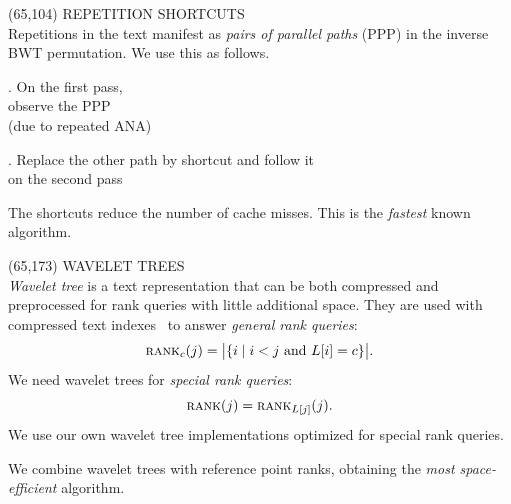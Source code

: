 \documentclass[a4paper]{article} %
\newcommand{\rank}{\textsc{rank}}
\begin{document}
\begin{textblock}{60}(65,104) 
  {\sffamily\normalsize{\color{sciorange}
      REPETITION SHORTCUTS}}\vspace{1mm}\\
  \footnotesize 
  Repetitions in the text manifest as \emph{pairs of parallel paths}
  (PPP) in the inverse BWT permutation. We use this as follows.
  \vspace{3mm}

  \begin{minipage}[t]{29mm}
    \scriptsize\sffamily
    . On the {\color{first}first pass},\\observe the PPP\\
    (due to repeated ANA)
    \begin{center}
      
    \end{center}
  \end{minipage}
  \hfill
  \begin{minipage}[t]{29mm}
    \scriptsize\sffamily
    . Replace the {\color{second}other path} by shortcut and
    follow it\\on the second pass
    \begin{center}
      
    \end{center}
  \end{minipage}
  \vspace{3mm}
  
  The shortcuts reduce the number of cache misses.  This is the
  \emph{fastest} known algorithm.
\end{textblock} 

\begin{textblock}{60}(65,173)
  {\sffamily\normalsize{\color{sciorange}
      WAVELET TREES}}\vspace{1mm}\\
  \footnotesize 
  \emph{Wavelet tree} is a text representation that can be both
  compressed and preprocessed for rank que\-ries with little
  additional space.  They are used with compressed text
  indexes~\cite{nm2007} to answer \emph{general rank queries}:
  \[
  \rank_c(j)=\big|\{i \mid i<j \textrm{ and }
  L[i]=c\}\big|.
  \]
  We need wavelet trees for \emph{special rank queries}:
  \[
  \rank(j)=\rank_{L[j]}(j).
  \]
  We use our own wavelet tree implementations optimized for special
  rank queries.
  \vspace{1mm}

  We combine wavelet trees with reference point
  ranks, obtaining the \emph{most space-efficient} algorithm.
\end{textblock} 
\end{document}
